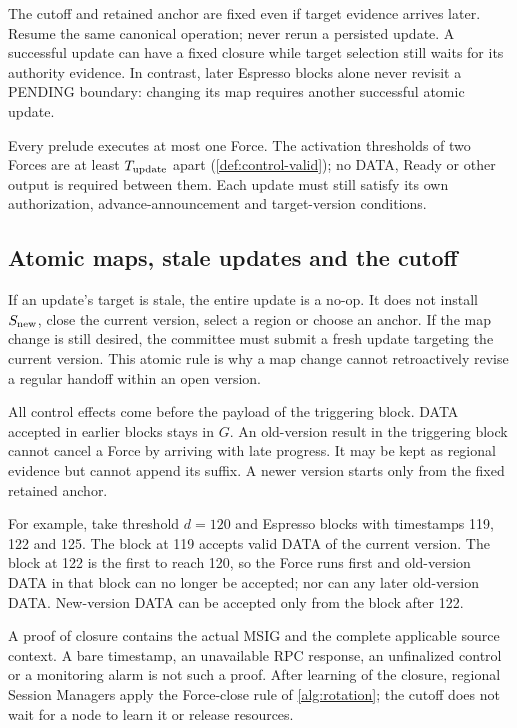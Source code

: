 \documentclass[11pt,a4paper]{article}
\begin{document}
The cutoff and retained anchor are fixed even if target evidence arrives
later. Resume the same canonical operation; never rerun a persisted
update. A successful update can have a fixed closure while target
selection still waits for its authority evidence. In contrast, later
Espresso blocks alone never revisit a PENDING boundary: changing its map
requires another successful atomic update.

Every prelude executes at most one Force. The activation thresholds of
two Forces are at least $T_{\rm update}$ apart
(\cref{def:control-valid}); no DATA, Ready or other output is required
between them.
Each update must still satisfy its own authorization,
advance-announcement and target-version conditions.

\subsection{Atomic maps, stale updates and the cutoff}
If an update's target is stale, the entire update is a no-op. It does not
install $S_{\rm new}$, close the current version, select a region or
choose an anchor. If the map change is still desired, the committee must
submit a fresh update targeting the current version. This atomic rule is
why a map change cannot retroactively revise a regular handoff within an
open version.

All control effects come before the payload of the triggering block.
DATA accepted in earlier blocks stays in $G$. An old-version result in
the triggering block cannot cancel a Force by arriving with late
progress. It may be kept as regional evidence but cannot append its
suffix. A newer version starts only from the fixed retained anchor.

For example, take threshold $d=120$ and Espresso blocks with timestamps
119, 122 and 125. The block at 119 accepts valid DATA of the current
version. The block at 122 is the first to reach 120, so the Force runs
first and old-version DATA in that block can no longer be accepted;
nor can any later old-version DATA. New-version DATA can be accepted only
from the block after 122.

A proof of closure contains the actual MSIG and the complete applicable
source context. A bare timestamp, an unavailable RPC response, an
unfinalized control or a monitoring alarm is not such a proof. After
learning of the closure, regional Session Managers apply
the Force-close rule of \cref{alg:rotation}; the cutoff does not wait
for a node to learn it or release resources.
\end{document}
